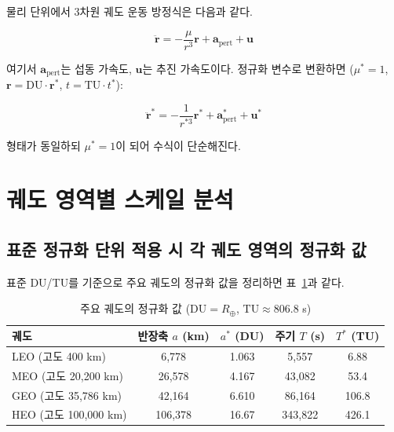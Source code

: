 \documentclass[11pt]{article}
\begin{document}
물리 단위에서 3차원 궤도 운동 방정식은 다음과 같다.

\begin{equation}
  \ddot{\mathbf{r}} = -\frac{\mu}{r^3}\mathbf{r} + \mathbf{a}_{\text{pert}} + \mathbf{u}
\end{equation}

여기서 $\mathbf{a}_{\text{pert}}$는 섭동 가속도, $\mathbf{u}$는 추진 가속도이다.
정규화 변수로 변환하면 ($\mu^*=1$, $\mathbf{r} = \text{DU}\cdot\mathbf{r}^*$, $t = \text{TU}\cdot t^*$):

\begin{equation}
  \ddot{\mathbf{r}}^* = -\frac{1}{r^{*3}}\mathbf{r}^* + \mathbf{a}_{\text{pert}}^* + \mathbf{u}^*
  \label{eq:eom_normalized}
\end{equation}

형태가 동일하되 $\mu^* = 1$이 되어 수식이 단순해진다.

\section{궤도 영역별 스케일 분석}

\subsection{표준 정규화 단위 적용 시 각 궤도 영역의 정규화 값}

표준 DU/TU를 기준으로 주요 궤도의 정규화 값을 정리하면 표~\ref{tab:orbit_scale}과 같다.

\begin{table}[h]
  \centering
  \caption{주요 궤도의 정규화 값 ($\text{DU} = R_\oplus$, $\text{TU} \approx 806.8$ s)}
  \label{tab:orbit_scale}
  \begin{tabular}{lcccc}
    \toprule
    궤도 & 반장축 $a$ (km) & $a^*$ (DU) & 주기 $T$ (s) & $T^*$ (TU) \\
    \midrule
    LEO (고도 400 km)  & 6{,}778 & 1.063 & 5{,}557 & 6.88 \\
    MEO (고도 20,200 km) & 26{,}578 & 4.167 & 43{,}082 & 53.4 \\
    GEO (고도 35,786 km) & 42{,}164 & 6.610 & 86{,}164 & 106.8 \\
    HEO (고도 100,000 km) & 106{,}378 & 16.67 & 343{,}822 & 426.1 \\
    \bottomrule
  \end{tabular}
\end{table}
\end{document}
